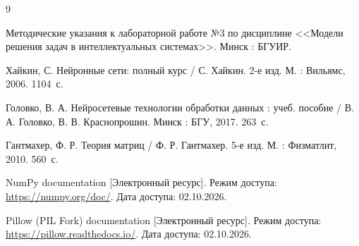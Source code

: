 \begin{thebibliography}{9}

	Методические указания к лабораторной работе №3 по дисциплине <<Модели решения задач в интеллектуальных системах>>. \mdash{} Минск : БГУИР.

	Хайкин, С. Нейронные сети: полный курс / С. Хайкин. \mdash{} 2-е изд. \mdash{} М. : Вильямс, 2006. \mdash{} 1104~с.

	Головко, В. А. Нейросетевые технологии обработки данных : учеб. пособие / В. А. Головко, В. В. Краснопрошин. \mdash{} Минск : БГУ, 2017. \mdash{} 263~с.

	Гантмахер, Ф. Р. Теория матриц / Ф. Р. Гантмахер. \mdash{} 5-е изд. \mdash{} М. : Физматлит, 2010. \mdash{} 560~с.

	NumPy documentation [Электронный ресурс]. \mdash{} Режим доступа: \url{https://numpy.org/doc/}. \mdash{} Дата доступа: 02.10.2026.

	Pillow (PIL Fork) documentation [Электронный ресурс]. \mdash{} Режим доступа: \url{https://pillow.readthedocs.io/}. \mdash{} Дата доступа: 02.10.2026.
\end{thebibliography}
